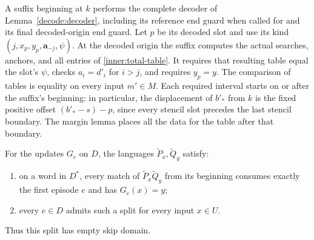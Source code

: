 A suffix beginning at $k$ performs the complete decoder of
Lemma~\ref{decode:decoder}, including its reference end guard
when called for and its final decoded-origin end guard.
Let $p$ be its decoded slot and use its kind
$(j,x_p,y_p,\mathbf a_{-j},\psi)$.  At the decoded origin the
suffix computes the actual searches, anchors, and all entries
of \eqref{inner:total-table}.  It requires that resulting table
equal the slot's $\psi$, checks $a_i=d'_i$ for $i>j$, and requires
$y_p=y$.  The comparison of tables is equality on every input
$m'\in M$.  Each required interval starts on or after the
suffix's beginning: in particular, the displacement of $b'_*$
from $k$ is the fixed positive offset $(b'_*-s)-p$, since every
stencil slot precedes the last stencil boundary.  The margin lemma
places all the data for the table after that boundary.

\begin{proposition}\label{inner:split}
For the updates $G_e$ on $D$, the languages
$\widetilde P_x,\widetilde Q_y$ satisfy:
\begin{enumerate}
\item on a word in $D^*$, every match of
      $\widetilde P_x\widetilde Q_y$ from its beginning consumes
      exactly the first episode $e$ and has $G_e(x)=y$;
\item every $e\in D$ admits such a split for every input $x\in U$.
\end{enumerate}
Thus this split has empty skip domain.
\end{proposition}

